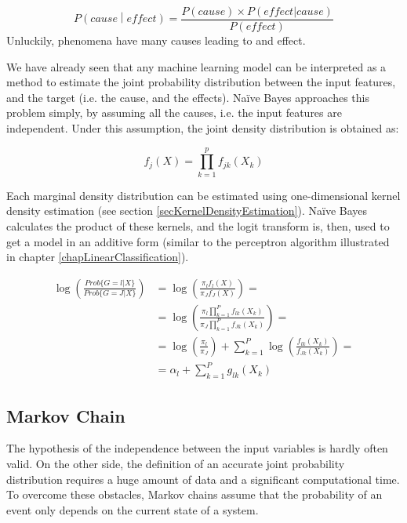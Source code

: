 \begin{equation}
        P\left(cause\middle| effect\right)=\frac{P\left(cause\right)\times P(effect|cause)}{P(effect)}
        \label{eq_naiveBayes1}
\end{equation}
Unluckily, phenomena have many causes leading to and effect. \par

We have already seen that any machine learning model can be interpreted as a method to estimate the joint probability distribution between the input features, and the target (i.e. the cause, and the effects). Naïve Bayes approaches this problem simply, by assuming all the causes, i.e. the input features are independent. Under this assumption, the joint density distribution is obtained as:

\begin{equation}
        f_j\left(X\right)=\prod_{k=1}^{p}{f_{jk}(X_k)}
        \label{eq_naiveBayes2}
\end{equation}

Each marginal density distribution can be estimated using one-dimensional kernel density estimation (see section \ref{secKernelDensityEstimation}). Naïve Bayes calculates the product of these kernels, and the logit transform is, then, used to get a model in an additive form (similar to the perceptron algorithm illustrated in chapter \ref{chapLinearClassification}).

\begin{equation}
\begin{split}
        \log\left(\frac{Prob\{G=l|X\}}{Prob\{G=J|X\}}\right) & =\log\left(\frac{\pi_lf_l(X)}{\pi_Jf_J(X)}\right)=\\
        & =\log{\left(\frac{\pi_l\prod_{k=1}^{P}{f_{lk}(X_k)}}{\pi_J\prod_{k=1}^{P}{f_{Jk}(X_k)}}\right)=}\\
        & =\log{\left(\frac{\pi_l}{\pi_J}\right)+\sum_{k=1}^{P}\log{\left(\frac{f_{lk}(X_k)}{f_{Jk}(X_k)}\right)=}}\\
        & =\alpha_l+\sum_{k=1}^{P}{g_{lk}(X_k)}
\end{split}
\label{eq_naiveBayes3}
\end{equation}

\subsection{Markov Chain}
The hypothesis of the independence between the input variables is hardly often valid. On the other side, the definition of an accurate joint probability distribution requires a huge amount of data and a significant computational time. To overcome these obstacles, Markov chains assume that the probability of an event only depends on the current state of a system. \par

